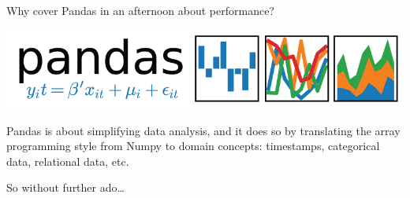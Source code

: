 \documentclass[aspectratio=169]{beamer}
\begin{document}
\begin{frame}{Why cover Pandas in an afternoon about performance?}
\large
\begin{center}
\includegraphics[width=0.5\linewidth]{pandas-logo.png}
\end{center}

\vspace{0.25 cm}
Pandas is about simplifying data analysis, and it does so by translating the array programming style from Numpy to domain concepts: timestamps, categorical data, relational data, etc.

\vspace{0.5 cm}

\vspace{0.5 cm}
\end{frame}

\begin{frame}{}
\LARGE
\vspace{1.5 cm}
\begin{center}
So without further ado\ldots
\end{center}
\end{frame}




\end{document}
